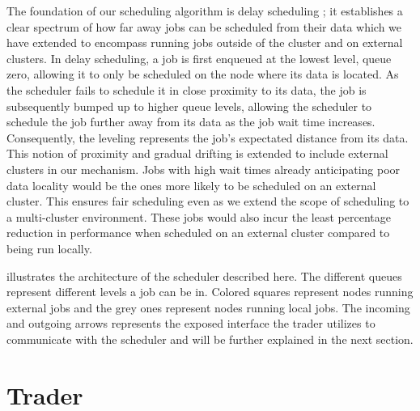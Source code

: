 The foundation of our scheduling algorithm is delay scheduling
\cite{zaharia_delay_2010}; it establishes a clear spectrum of how far away jobs
can be scheduled from their data which we have extended to encompass running jobs
outside of the cluster and on external clusters. In delay scheduling, a job is
first enqueued at the lowest level, queue zero, allowing it to only be
scheduled on the node where its data is located. As the scheduler fails to
schedule it in close proximity to its data, the job is subsequently bumped up
to higher queue levels, allowing the scheduler to schedule the job further away
from its data as the job wait time increases. Consequently, the leveling
represents the job's expectated distance from its data. This notion of proximity
and gradual drifting is extended to include external clusters in our mechanism.
Jobs with high wait times already anticipating poor data locality would be the
ones more likely to be scheduled on an external cluster. This ensures fair
scheduling even as we extend the scope of scheduling to a multi-cluster
environment. These jobs would also incur the least percentage reduction in
performance when scheduled on an external cluster compared to being run
locally.

 illustrates the architecture of the scheduler described here. The
different queues represent different levels a job can be in. Colored squares
represent nodes running external jobs and the grey ones represent nodes running
local jobs. The incoming and outgoing arrows represents the exposed interface
the trader utilizes to communicate with the scheduler and will be further
explained in the next section.






\section{Trader} \label{trader}

